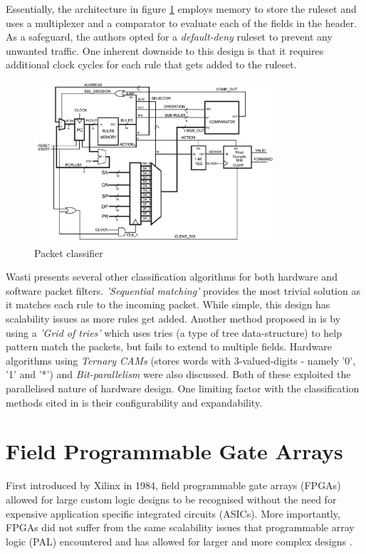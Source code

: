 Essentially, the architecture in figure \ref{fig:fast-fpga-classifier} employs memory to store the ruleset and uses a multiplexer and a comparator to evaluate each of the fields in the header. As a safeguard, the authors opted for a \textit{default-deny} ruleset to prevent any unwanted traffic. One inherent downside to this design is that it requires additional clock cycles for each rule that gets added to the ruleset. 


\begin{figure}[h]
    \centering
    \includegraphics[width=0.8\textwidth]{Images/packetFilterHardware.png}
    \caption[Packet classifier]{Packet classifier \cite{FastRecongifFPGAFirewall}}
    \label{fig:fast-fpga-classifier}
\end{figure}


Wasti \cite{Wasti2001HardwareAP} presents several other classification algorithms for both hardware and software packet filters. \textit{'Sequential matching'} provides the most trivial solution as it matches each rule to the incoming packet. While simple, this design has scalability issues as more rules get added. Another method proposed in \cite{Wasti2001HardwareAP} is by using a \textit{'Grid of tries'} which uses tries (a type of tree data-structure) to help pattern match the packets, but fails to extend to multiple fields. 
Hardware algorithms using \textit{Ternary CAMs} (stores words with 3-valued-digits - namely '0', '1' and '*') and \textit{Bit-parallelism} were also discussed. Both of these exploited the parallelised nature of hardware design. One limiting factor with the classification methods cited in \cite{Wasti2001HardwareAP} is their configurability and expandability. 








\section{Field Programmable Gate Arrays}
\label{subsection:fpga}	
First introduced by Xilinx in 1984, field programmable gate arrays (FPGAs) allowed for large custom logic designs to be recognised without the need for 
expensive application specific integrated circuits (ASICs). More importantly, FPGAs did not suffer from the same scalability issues that
programmable array logic (PAL) encountered and has allowed for larger and more complex designs \cite{30YearsOfFPGA}. 

